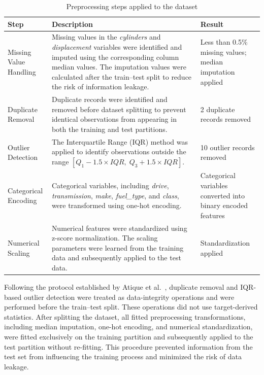 \begin{table}[H]
\centering
\renewcommand{\arraystretch}{1.3}
\begin{tabular}{|p{3.2cm}|p{6.5cm}|p{4.2cm}|}
\hline
\textbf{Step} & \textbf{Description} & \textbf{Result} \\
\hline

Missing Value Handling &
Missing values in the \textit{cylinders} and \textit{displacement} variables were identified and imputed using the corresponding column median values. The imputation values were calculated after the train--test split to reduce the risk of information leakage. &
Less than 0.5\% missing values; median imputation applied \\
\hline

Duplicate Removal &
Duplicate records were identified and removed before dataset splitting to prevent identical observations from appearing in both the training and test partitions. &
2 duplicate records removed \\
\hline

Outlier Detection &
The Interquartile Range (IQR) method was applied to identify observations outside the range $[Q_1 - 1.5 \times IQR,\; Q_3 + 1.5 \times IQR]$. &
10 outlier records removed \\
\hline

Categorical Encoding &
Categorical variables, including \textit{drive}, \textit{transmission}, \textit{make}, \textit{fuel\_type}, and \textit{class}, were transformed using one-hot encoding. &
Categorical variables converted into binary encoded features \\
\hline

Numerical Scaling &
Numerical features were standardized using z-score normalization. The scaling parameters were learned from the training data and subsequently applied to the test data. &
Standardization applied \\
\hline

\end{tabular}
\caption{Preprocessing steps applied to the dataset}
\label{tab:preprocessing_steps}
\end{table}


Following the protocol established by Atique et al.~\cite{atique2026explainable}, duplicate removal and IQR-based outlier detection were treated as data-integrity operations and were performed before the train--test split. These operations did not use target-derived statistics. After splitting the dataset, all fitted preprocessing transformations, including median imputation, one-hot encoding, and numerical standardization, were fitted exclusively on the training partition and subsequently applied to the test partition without re-fitting. This procedure prevented information from the test set from influencing the training process and minimized the risk of data leakage.


